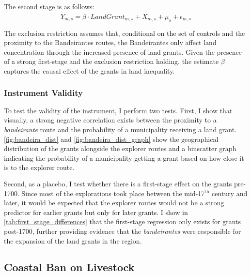 \documentclass[11pt]{article}
\begin{document}
The second stage is as follows:
\begin{equation}
  \label{eqn:ivequation}
  Y_{m,s} = \beta \cdot \widehat{LandGrant}_{m,s} + X_{m,s} + \mu_s +  \epsilon_{m,s}
\end{equation}

The exclusion restriction assumes that, conditional on the set of controls and the proximity to the Bandeirantes routes, the Bandeirantes only affect land concentration through the increased presence of land grants.
Given the presence of a strong first-stage and the exclusion restriction holding, the estimate $\beta$ captures the causal effect of the grants in land inequality. 

\subsubsection{Instrument Validity}

To test the validity of the instrument, I perform two tests.
First, I show that visually, a strong negative correlation exists between the proximity to a \textit{bandeirante} route and the probability of a municipality receiving a land grant. 
\autoref{fig:bandeira_dist} and \autoref{fig:bandeira_dist_graph} show the geographical distribution of the grants alongside the explorer routes and a binscatter graph indicating the probability of a municipality getting a grant based on how close it is to the explorer route. 

Second, as a placebo, I test whether there is a first-stage effect on the grants pre-1700. 
Since most of the explorations took place between the mid-17$^\text{th}$ century and later, it would be expected that the explorer routes would not be a strong predictor for earlier grants but only for later grants. 
I show in \autoref{tab:first_stage_differences} that the first-stage regression only exists for grants post-1700, further providing evidence that the \textit{bandeirantes} were responsible for the expansion of the land grants in the region. 

\subsection{Coastal Ban on Livestock}
\label{sec:coastal}
\end{document}
